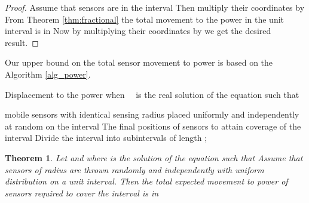 \documentclass[final,5p,times,twocolumn]{elsarticle_mod}
\newtheorem{theorem}{Theorem}
\begin{document}
\begin{proof}
Assume that  sensors are in the interval  Then multiply their coordinates by  From Theorem \ref{thm:fractional} 
the total movement to the power  in the unit interval is in  Now by multiplying their coordinates by 
we get the desired result. 
\end{proof}
Our upper bound on the total sensor movement to power  is based on the Algorithm \ref{alg_power}.
\begin{algorithm}
\caption{Displacement to the power  when  \,\,\,\,  
 is the real solution of the equation  such that 
}
\label{alg_power}
\begin{algorithmic}[1]
 \REQUIRE  mobile sensors with identical sensing radius   placed uniformly and independently at random on the interval 
 \ENSURE  The final positions of sensors to attain coverage of the interval 
\STATE Divide the interval into subintervals of length ;
   \ELSE 
   \ENDIF
\end{algorithmic}
\end{algorithm}
\begin{theorem}
\label{thm:alg}
Let   and  where 
is the solution of the equation  such that 
Assume that  sensors of radius  are thrown randomly and independently
with uniform distribution on a unit interval. 
Then the total expected movement to power  of sensors required to cover the interval is in

\end{theorem} 
\end{document}
